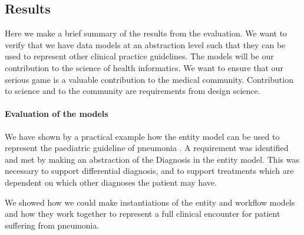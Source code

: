 \subsection{Results}
Here we make a brief summary of the results from the evaluation. We want to verify that we have data models at an abstraction level such that they can be used to represent other clinical practice guidelines. The models will be our contribution to the science of health informatics. We want to ensure that our serious game is a valuable contribution to the medical community. Contribution to science and to the community are requirements from design science.

\paragraph{Evaluation of the models}
We have shown by a practical example how the entity model can be used to represent the paediatric guideline of pneumonia \parencite{RepublicofKeny2016}. A requirement was identified and met by making an abstraction of the Diagnosis in the entity model. This was necessary to support differential diagnosis, and to support treatments which are dependent on which other diagnoses the patient may have. 

We showed how we could make instantiations of the entity and workflow models and how they work together to represent a full clinical encounter for patient suffering from pneumonia.


